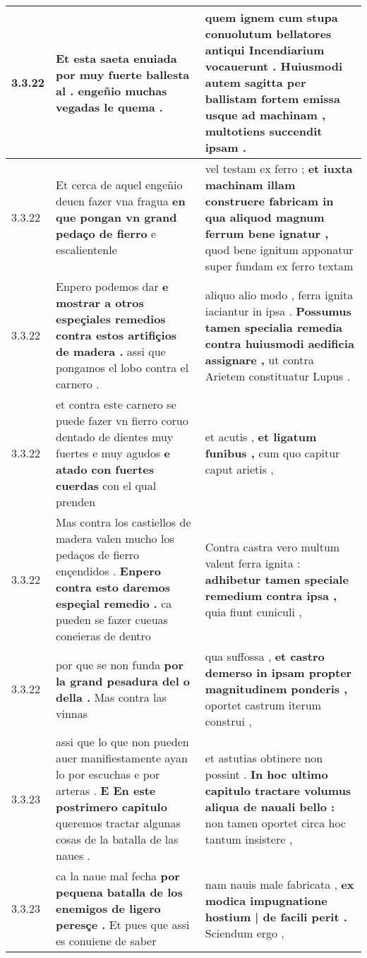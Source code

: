 \begin{tabular}{|p{1cm}|p{6.5cm}|p{6.5cm}|}
3.3.22 & Et esta saeta enuiada \textbf{ por muy fuerte ballesta al . } engeñio muchas vegadas le quema . & quem ignem cum stupa conuolutum bellatores antiqui Incendiarium vocauerunt . \textbf{ Huiusmodi autem sagitta per ballistam fortem emissa usque ad machinam , } multotiens succendit ipsam . \\\hline
3.3.22 & Et cerca de aquel engeñio deuen fazer vna fragua \textbf{ en que pongan vn grand pedaço de fierro } e escalientenle & vel testam ex ferro ; \textbf{ et iuxta machinam illam construere fabricam in qua aliquod magnum ferrum bene ignatur , } quod bene ignitum apponatur super fundam ex ferro textam \\\hline
3.3.22 & Enpero podemos dar \textbf{ e mostrar a otros espeçiales remedios contra estos artifiçios de madera . } assi que pongamos el lobo contra el carnero . & aliquo alio modo , ferra ignita iaciantur in ipsa . \textbf{ Possumus tamen specialia remedia contra huiusmodi aedificia assignare , } ut contra Arietem constituatur Lupus . \\\hline
3.3.22 & et contra este carnero se puede fazer vn fierro coruo dentado de dientes muy fuertes e muy agudos \textbf{ e atado con fuertes cuerdas } con el qual prenden & et acutis , \textbf{ et ligatum funibus , } cum quo capitur caput arietis , \\\hline
3.3.22 & Mas contra los castiellos de madera valen mucho los pedaços de fierro ençendidos . \textbf{ Enpero contra esto daremos espeçial remedio . } ca pueden se fazer cueuas coneieras de dentro & Contra castra vero multum valent ferra ignita : \textbf{ adhibetur tamen speciale remedium contra ipsa , } quia fiunt cuniculi , \\\hline
3.3.22 & por que se non funda \textbf{ por la grand pesadura del o della . } Mas contra las vinnas & qua suffossa , \textbf{ et castro demerso in ipsam propter magnitudinem ponderis , } oportet castrum iterum construi , \\\hline
3.3.23 & assi que lo que non pueden auer manifiestamente ayan lo por escuchas e por arteras . \textbf{ E En este postrimero capitulo } queremos tractar algunas cosas de la batalla de las naues . & et astutias obtinere non possint . \textbf{ In hoc ultimo capitulo tractare volumus aliqua de nauali bello : } non tamen oportet circa hoc tantum insistere , \\\hline
3.3.23 & ca la naue mal fecha \textbf{ por pequena batalla de los enemigos de ligero peresçe . } Et pues que assi es conuiene de saber & nam nauis male fabricata , \textbf{ ex modica impugnatione hostium | de facili perit . } Sciendum ergo , \\\hline

\end{tabular}
